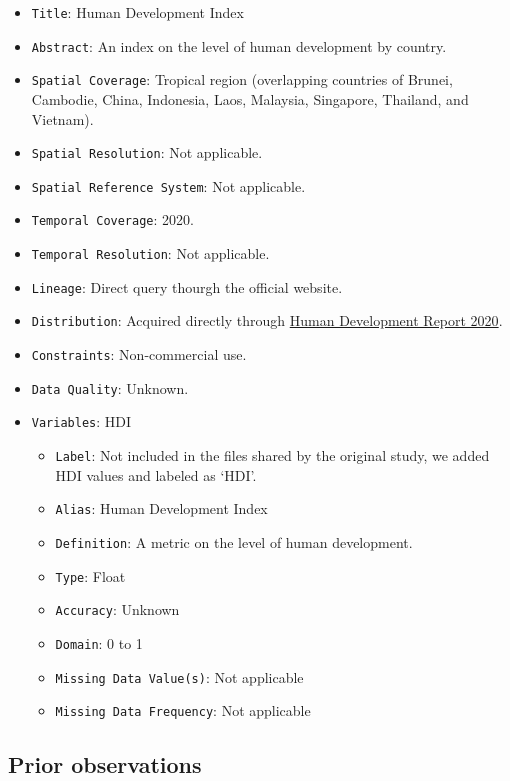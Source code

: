 \documentclass[
]{article}
\providecommand{\tightlist}{%
  \setlength{\itemsep}{0pt}\setlength{\parskip}{0pt}}
\begin{document}
\begin{itemize}
\item
  \texttt{Title}: Human Development Index
\item
  \texttt{Abstract}: An index on the level of human development by
  country.
\item
  \texttt{Spatial\ Coverage}: Tropical region (overlapping countries of
  Brunei, Cambodie, China, Indonesia, Laos, Malaysia, Singapore,
  Thailand, and Vietnam).
\item
  \texttt{Spatial\ Resolution}: Not applicable.
\item
  \texttt{Spatial\ Reference\ System}: Not applicable.
\item
  \texttt{Temporal\ Coverage}: 2020.
\item
  \texttt{Temporal\ Resolution}: Not applicable.
\item
  \texttt{Lineage}: Direct query thourgh the official website.
\item
  \texttt{Distribution}: Acquired directly through
  \href{https://hdr.undp.org/sites/default/files/2021-22_HDR/HDR21-22_Statistical_Annex_HDI_Table.xlsx}{Human
  Development Report 2020}.
\item
  \texttt{Constraints}: Non-commercial use.
\item
  \texttt{Data\ Quality}: Unknown.
\item
  \texttt{Variables}: HDI

  \begin{itemize}
  \tightlist
  \item
    \texttt{Label}: Not included in the files shared by the original
    study, we added HDI values and labeled as `HDI'.
  \item
    \texttt{Alias}: Human Development Index
  \item
    \texttt{Definition}: A metric on the level of human development.
  \item
    \texttt{Type}: Float
  \item
    \texttt{Accuracy}: Unknown
  \item
    \texttt{Domain}: 0 to 1
  \item
    \texttt{Missing\ Data\ Value(s)}: Not applicable
  \item
    \texttt{Missing\ Data\ Frequency}: Not applicable
  \end{itemize}
\end{itemize}

\hypertarget{prior-observations}{%
\subsection{Prior observations}\label{prior-observations}}
\end{document}
